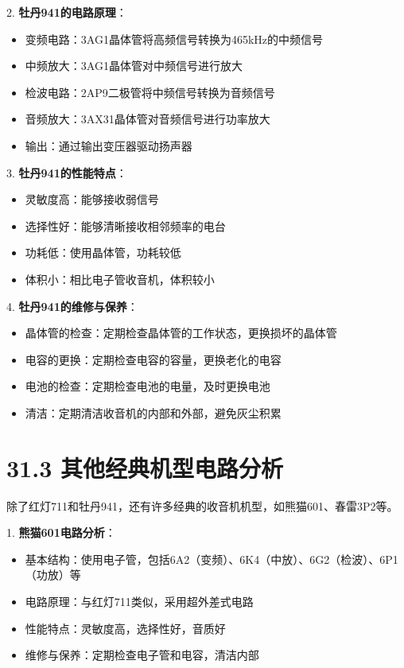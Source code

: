 \documentclass[12pt,UTF8]{ctexbook}
\begin{document}
2. \textbf{牡丹941的电路原理}：
   \begin{itemize}[leftmargin=3.5em]
   \item 变频电路：3AG1晶体管将高频信号转换为465kHz的中频信号
   \item 中频放大：3AG1晶体管对中频信号进行放大
   \item 检波电路：2AP9二极管将中频信号转换为音频信号
   \item 音频放大：3AX31晶体管对音频信号进行功率放大
   \item 输出：通过输出变压器驱动扬声器
   \end{itemize}

3. \textbf{牡丹941的性能特点}：
   \begin{itemize}[leftmargin=3.5em]
   \item 灵敏度高：能够接收弱信号
   \item 选择性好：能够清晰接收相邻频率的电台
   \item 功耗低：使用晶体管，功耗较低
   \item 体积小：相比电子管收音机，体积较小
   \end{itemize}

4. \textbf{牡丹941的维修与保养}：
   \begin{itemize}[leftmargin=3.5em]
   \item 晶体管的检查：定期检查晶体管的工作状态，更换损坏的晶体管
   \item 电容的更换：定期检查电容的容量，更换老化的电容
   \item 电池的检查：定期检查电池的电量，及时更换电池
   \item 清洁：定期清洁收音机的内部和外部，避免灰尘积累
   \end{itemize}

\section*{31.3 其他经典机型电路分析}

除了红灯711和牡丹941，还有许多经典的收音机机型，如熊猫601、春雷3P2等。

1. \textbf{熊猫601电路分析}：
   \begin{itemize}[leftmargin=3.5em]
   \item 基本结构：使用电子管，包括6A2（变频）、6K4（中放）、6G2（检波）、6P1（功放）等
   \item 电路原理：与红灯711类似，采用超外差式电路
   \item 性能特点：灵敏度高，选择性好，音质好
   \item 维修与保养：定期检查电子管和电容，清洁内部
   \end{itemize}
\end{document}
